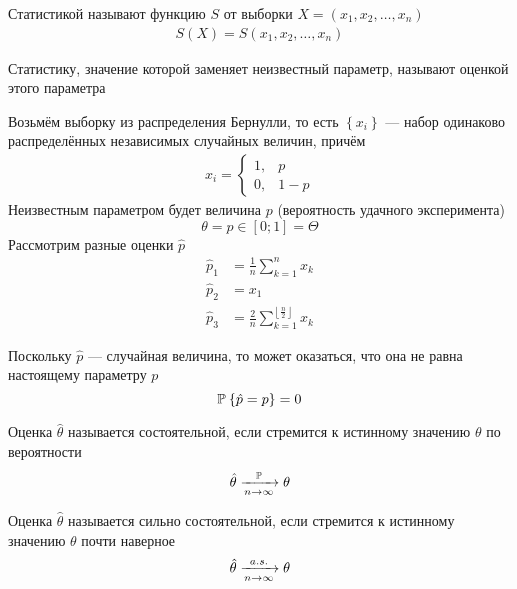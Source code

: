 \begin{definition}[Статистика]
  \label{def:statistic}
  Статистикой называют функцию $S$ от выборки
  $X=\left(x_1,x_2,\dots,x_n\right)$
  \begin{align*}
    S\left(X\right) = S\left(x_1, x_2, \dots, x_n\right)
  \end{align*}
\end{definition}
\begin{definition}[Оценка]Статистику,
  значение которой заменяет неизвестный параметр,
  называют оценкой этого параметра
\end{definition}
\begin{example}\label{example:bernulliEstimator}
  Возьмём выборку из распределения Бернулли,
  то есть $\left\{x_i\right\}$ --- набор одинаково распределённых
  независимых случайных величин, причём
  \begin{align*}
  x_i=
  \begin{cases}
    1,&p\\
    0,&1-p
  \end{cases}
  \end{align*}
  Неизвестным параметром будет величина $p$
  (вероятность удачного эксперимента)
  $$\theta=p\in\left[0;1\right]=\Theta$$
  Рассмотрим разные оценки $\hat{p}$
  \begin{align*}
    \hat{p}_1&=\frac{1}{n}\sum_{k=1}^n x_k\\
    \hat{p}_2&=x_1\\
    \hat{p}_3&=
      \frac{2}{n}\sum_{k=1}^{\left\lfloor \frac{n}{2} \right\rfloor} x_k
  \end{align*}
\end{example}

\begin{remark}
Поскольку $\hat{p}$ --- случайная величина, то может оказаться,
что она не равна настоящему параметру $p$
$$\mathbb{P}_{{}}\left\{ \hat{p}=p \right\}=0$$
\end{remark}

\begin{definition}
  Оценка $\hat{\theta}$ называется состоятельной,
  если стремится к истинному значению $\theta$ по вероятности
  $$\hat{\theta}\xrightarrow[n\to\infty]{\mathbb{P}}\theta$$
\end{definition}

\begin{definition}
  Оценка $\hat{\theta}$ называется сильно состоятельной,
  если стремится к истинному значению $\theta$ почти наверное
  $$\hat{\theta}\xrightarrow[n\to\infty]{a.s.}\theta$$
\end{definition}

